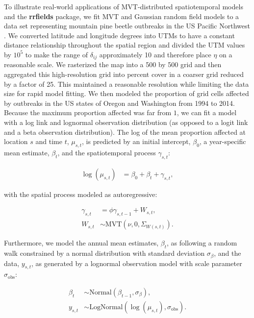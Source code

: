 \documentclass[12pt,english]{article}
\begin{document}
\begin{spacing}{1.5}
To illustrate real-world applications of MVT-distributed
spatiotemporal models and the \textbf{rrfields} package,
we fit MVT and Gaussian random field models
to a data set representing
mountain pine beetle outbreaks in the
US Pacific Northwest \citep{usdaforestservice2017}. 
We converted latitude and longitude degrees into UTMs to have a constant
distance relationship throughout the spatial region and divided the UTM values
by $10^5$ to make the range of $\delta_{ij}$ approximately 10 and therefore
place $\eta$ on a reasonable scale.
We rasterized the map into a 500 by 500 grid
and then aggregated this high-resolution grid
into percent cover in a coarser grid reduced by a factor of 25.
This maintained a reasonable resolution
while limiting the data size for rapid model fitting.
We then modeled the
proportion of grid cells affected by outbreaks
in the US states of Oregon and Washington from 1994 to 2014.
Because the maximum proportion affected was far from $1$, we
can fit a model with a log link and lognormal observation distribution
(as opposed to a logit link and a beta observation distribution).
The log of the mean proportion affected at location $s$ and time $t$, $\mu_{s,t}$,
is predicted by an initial intercept, $\beta_0$, a year-specific mean estimate, $\beta_t$,
and the spatiotemporal process $\gamma_{s,t}$:

\begin{align}
  \log(\mu_{s,t}) &= \beta_0 + \beta_t + \gamma_{s,t},
  \end{align}

\noindent with the spatial process modeled as autoregressive:

\begin{align}
    \gamma_{s,t} &= \phi \gamma_{s,t-1} + W_{s,t},\\ \label{eq:beetle-mu}
     W_{s,t} &\sim \mathrm{MVT}\left(\nu, 0, \Sigma_{W(s,t)}\right).
 \end{align}

\noindent Furthermore, we model the annual
mean estimates, $\beta_t$, as following a random walk
constrained by a normal distribution with standard deviation $\sigma_{\beta}$,
and the data, $y_{s,t}$, as generated by a lognormal observation model
with scale parameter $\sigma_{\mathrm{obs}}$:

 \begin{align}
 \beta_t &\sim \mathrm{Normal}\left( \beta_{t-1}, \sigma_{\beta} \right),\\
  y_{s,t} &\sim \mathrm{LogNormal} \left(  \log(\mu_{s,t}), \sigma_{\mathrm{obs}} \right).
 \end{align}


\end{spacing}
\end{document}
